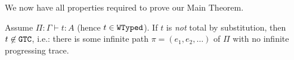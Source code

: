 We now have all properties required to prove our Main Theorem.


\begin{theorem}
\label{theorem-main-finite-safe-reduction}
  Assume $\Pi:\Gamma\vdash t : A$ (hence $t\in {\tt WTyped}$).
  If $t$ is \emph{not} total by substitution, then $t \not \in {\tt GTC}$, i.e.:
  there is some infinite path $\pi = (e_1, e_2, \ldots)$ of $\Pi$ with no infinite progressing trace. 
\end{theorem}


%
%
